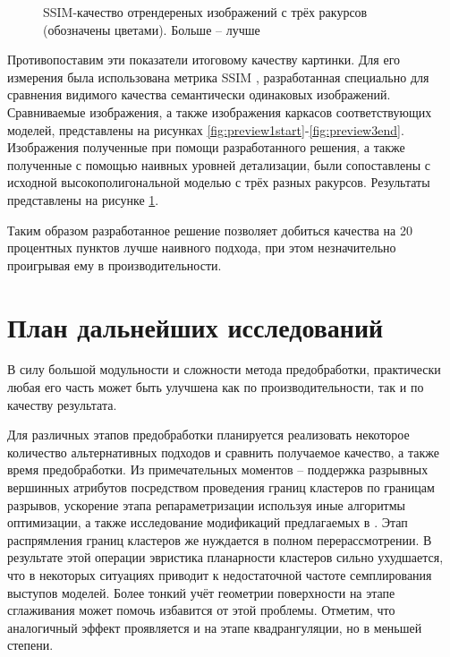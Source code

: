 \documentclass[12pt]{extarticle}
\begin{document}
\begin{figure}
  \centering
  \caption{SSIM-качество отрендереных изображений с трёх ракурсов (обозначены цветами). Больше -- лучше}
  \label{fig:quality}
\end{figure}

Противопоставим эти показатели итоговому качеству картинки. Для его измерения была использована метрика SSIM \cite{wang2004image}, разработанная специально для сравнения видимого качества семантически одинаковых изображений. Сравниваемые изображения, а также изображения каркасов соответствующих моделей, представлены на рисунках \ref{fig:preview1start}-\ref{fig:preview3end}. Изображения полученные при помощи разработанного решения, а также полученные с помощью наивных уровней детализации, были сопоставлены с исходной высокополигональной моделью с трёх разных ракурсов. Результаты представлены на рисунке \ref{fig:quality}.

Таким образом разработанное решение позволяет добиться качества на 20 процентных пунктов лучше наивного подхода, при этом незначительно проигрывая ему в производительности.


\section{План дальнейших исследований}
В силу большой модульности и сложности метода предобработки, практически любая его часть может быть улучшена как по производительности, так и по качеству результата.

Для различных этапов предобработки планируется реализовать некоторое количество альтернативных подходов и сравнить получаемое качество, а также время предобработки. Из примечательных моментов -- поддержка разрывных вершинных атрибутов посредством проведения границ кластеров по границам разрывов, ускорение этапа репараметризации используя иные алгоритмы оптимизации, а также исследование модификаций предлагаемых в \cite{feng2010feature}. Этап распрямления границ кластеров же нуждается в полном перерассмотрении. В результате этой операции эвристика планарности кластеров сильно ухудшается, что в некоторых ситуациях приводит к недостаточной частоте семплирования выступов моделей. Более тонкий учёт геометрии поверхности на этапе сглаживания может помочь избавится от этой проблемы. Отметим, что аналогичный эффект проявляется и на этапе квадрангуляции, но в меньшей степени.
\end{document}
